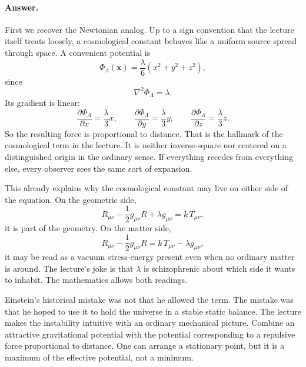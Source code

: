 \paragraph{Answer.} First we recover the Newtonian analog. Up to a sign convention that the lecture itself treats loosely, a cosmological constant behaves like a uniform source spread through space. A convenient potential is
\begin{equation}
\Phi_\Lambda(\mathbf{x})
=
\frac{\lambda}{6}\left(x^2+y^2+z^2\right),
\end{equation}
since
\begin{equation}
\nabla^2\Phi_\Lambda=\lambda.
\end{equation}
Its gradient is linear:
\begin{equation}
\frac{\partial \Phi_\Lambda}{\partial x}=\frac{\lambda}{3}x,
\qquad
\frac{\partial \Phi_\Lambda}{\partial y}=\frac{\lambda}{3}y,
\qquad
\frac{\partial \Phi_\Lambda}{\partial z}=\frac{\lambda}{3}z.
\end{equation}
So the resulting force is proportional to distance. That is the hallmark of the cosmological term in the lecture. It is neither inverse-square nor centered on a distinguished origin in the ordinary sense. If everything recedes from everything else, every observer sees the same sort of expansion.

This already explains why the cosmological constant may live on either side of the equation. On the geometric side,
\begin{equation}
R_{\mu\nu}-\frac12 g_{\mu\nu}R+\lambda g_{\mu\nu}=k\,T_{\mu\nu},
\end{equation}
it is part of the geometry. On the matter side,
\begin{equation}
R_{\mu\nu}-\frac12 g_{\mu\nu}R
=
k\,T_{\mu\nu}-\lambda g_{\mu\nu},
\end{equation}
it may be read as a vacuum stress-energy present even when no ordinary matter is around. The lecture's joke is that \(\lambda\) is schizophrenic about which side it wants to inhabit. The mathematics allows both readings.

Einstein's historical mistake was not that he allowed the term. The mistake was that he hoped to use it to hold the universe in a stable static balance. The lecture makes the instability intuitive with an ordinary mechanical picture. Combine an attractive gravitational potential with the potential corresponding to a repulsive force proportional to distance. One can arrange a stationary point, but it is a maximum of the effective potential, not a minimum.

